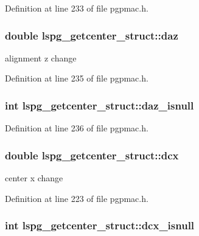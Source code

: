 Definition at line 233 of file pgpmac.\-h.

\hypertarget{structlspg__getcenter__struct_a1170bab2161f03ab29c39f79519ed9ae}{
\subsubsection[{daz}]{\setlength{\rightskip}{0pt plus 5cm}double lspg\-\_\-getcenter\-\_\-struct\-::daz}}\label{structlspg__getcenter__struct_a1170bab2161f03ab29c39f79519ed9ae}


alignment z change 



Definition at line 235 of file pgpmac.\-h.

\hypertarget{structlspg__getcenter__struct_a36742b6bd0f4bf9356414930ba893617}{
\subsubsection[{daz\-\_\-isnull}]{\setlength{\rightskip}{0pt plus 5cm}int lspg\-\_\-getcenter\-\_\-struct\-::daz\-\_\-isnull}}\label{structlspg__getcenter__struct_a36742b6bd0f4bf9356414930ba893617}


Definition at line 236 of file pgpmac.\-h.

\hypertarget{structlspg__getcenter__struct_ade0534056296e9ed568404c538be9227}{
\subsubsection[{dcx}]{\setlength{\rightskip}{0pt plus 5cm}double lspg\-\_\-getcenter\-\_\-struct\-::dcx}}\label{structlspg__getcenter__struct_ade0534056296e9ed568404c538be9227}


center x change 



Definition at line 223 of file pgpmac.\-h.

\hypertarget{structlspg__getcenter__struct_aa404da85af654998f039c81a77626748}{
\subsubsection[{dcx\-\_\-isnull}]{\setlength{\rightskip}{0pt plus 5cm}int lspg\-\_\-getcenter\-\_\-struct\-::dcx\-\_\-isnull}}\label{structlspg__getcenter__struct_aa404da85af654998f039c81a77626748}


